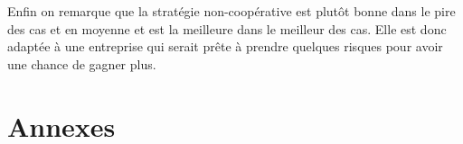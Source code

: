\documentclass{scrartcl}
\begin{document}
    Enfin on remarque que la stratégie non-coopérative est plutôt bonne dans le
    pire des cas et en moyenne et est la meilleure dans le meilleur des cas.
    Elle est donc adaptée à une entreprise qui serait prête à prendre quelques
    risques pour avoir une chance de gagner plus.
    
\section{Annexes}
  
  
  
  
  
  
  
\end{document}
